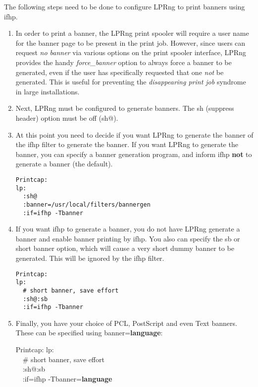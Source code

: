 \documentclass[a4paper]{article}
\begin{document}
The following steps need to be done to configure LPRng to print
banners using
{\ttfamily ifhp}.
\begin{enumerate}
\item In order to print a banner,
the LPRng print spooler will require a user name
for the banner page to be present in the print job.
However,
since users can request
{\itshape no banner\/}
via various options on the print spooler interface,
LPRng provides the handy
{\itshape force\_banner\/}
option to always force a banner to be generated,
even if the user has specifically requested that one
{\itshape not\/}
be generated.
This is useful for preventing the
{\itshape disappearing print job\/}
syndrome in large installations.
\item Next,
LPRng must be configured to generate banners.
The
{\ttfamily sh}
(suppress header)
option must be off
({\ttfamily sh@}).
\item At this point you need to decide if you want LPRng to generate
the banner of the
{\ttfamily ifhp}
filter to generate the banner.
If you want LPRng to generate the banner,
you can specify a
{\ttfamily banner}
generation program,
and inform
{\ttfamily ifhp}
{\bfseries not}
to generate a banner (the default).
\begin{tscreen}
\begin{verbatim}
Printcap:
lp:
  :sh@
  :banner=/usr/local/filters/bannergen
  :if=ifhp -Tbanner
\end{verbatim}
\end{tscreen}
\item If you want
{\ttfamily ifhp}
to generate a banner,
you do not have LPRng generate a banner and
enable banner printing by
{\ttfamily ifhp}.
You also can specify the
{\ttfamily sb}
or short banner option,
which will cause a very short dummy banner to be generated.
This will be ignored by the
{\ttfamily ifhp}
filter.
\begin{tscreen}
\begin{verbatim}
Printcap:
lp:
  # short banner, save effort
  :sh@:sb
  :if=ifhp -Tbanner
\end{verbatim}
\end{tscreen}
\item Finally,
you have your choice of PCL,
PostScript and even Text banners.
These can be specified using
{\ttfamily banner=}{\bfseries language}:
\begin{tscreen}
Printcap:
lp: \\ 
~~\# short banner, save effort \\ 
~~:sh@:sb \\ 
~~:if=ifhp -Tbanner={\bfseries language} \\ 
\end{tscreen}
\end{enumerate}
\end{document}
